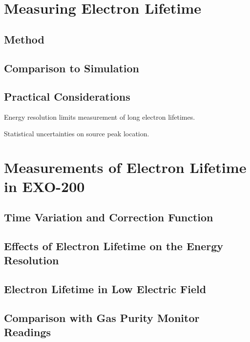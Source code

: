 \documentclass[herrin-thesis.tex]{subfiles}
\begin{document}
\section{Measuring Electron Lifetime}


\subsection{Method}

\subsection{Comparison to Simulation}

\subsection{Practical Considerations}

Energy resolution limits measurement of long electron lifetimes.

Statistical uncertainties on source peak location.

\section{Measurements of Electron Lifetime in EXO-200}

\subsection{Time Variation and Correction Function}

\subsection{Effects of Electron Lifetime on the Energy Resolution}

\subsection{Electron Lifetime in Low Electric Field}

\subsection{Comparison with Gas Purity Monitor Readings}
\end{document}
